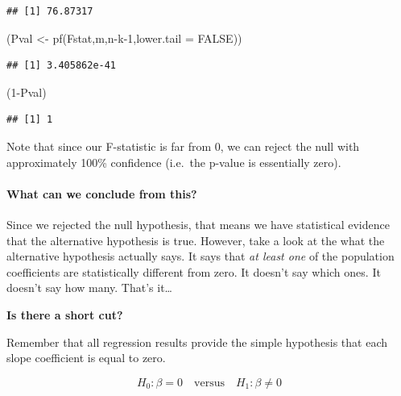 \documentclass[
]{book}
\newenvironment{Shaded}{\begin{snugshade}}{\end{snugshade}}
\newcommand{\AttributeTok}[1]{\textcolor[rgb]{0.77,0.63,0.00}{#1}}
\newcommand{\ConstantTok}[1]{\textcolor[rgb]{0.00,0.00,0.00}{#1}}
\newcommand{\DecValTok}[1]{\textcolor[rgb]{0.00,0.00,0.81}{#1}}
\newcommand{\FunctionTok}[1]{\textcolor[rgb]{0.00,0.00,0.00}{#1}}
\newcommand{\NormalTok}[1]{#1}
\newcommand{\OtherTok}[1]{\textcolor[rgb]{0.56,0.35,0.01}{#1}}
\newcommand{\SpecialCharTok}[1]{\textcolor[rgb]{0.00,0.00,0.00}{#1}}
\begin{document}
\begin{verbatim}
## [1] 76.87317
\end{verbatim}

\begin{Shaded}
\begin{Highlighting}[]
\NormalTok{(Pval }\OtherTok{\textless{}{-}} \FunctionTok{pf}\NormalTok{(Fstat,m,n}\SpecialCharTok{{-}}\NormalTok{k}\DecValTok{{-}1}\NormalTok{,}\AttributeTok{lower.tail =} \ConstantTok{FALSE}\NormalTok{))}
\end{Highlighting}
\end{Shaded}

\begin{verbatim}
## [1] 3.405862e-41
\end{verbatim}

\begin{Shaded}
\begin{Highlighting}[]
\NormalTok{(}\DecValTok{1}\SpecialCharTok{{-}}\NormalTok{Pval)}
\end{Highlighting}
\end{Shaded}

\begin{verbatim}
## [1] 1
\end{verbatim}

Note that since our F-statistic is far from 0, we can reject the null with approximately 100\% confidence (i.e.~the p-value is essentially zero).

\hypertarget{what-can-we-conclude-from-this}{%
\paragraph*{What can we conclude from this?}\label{what-can-we-conclude-from-this}}

Since we rejected the null hypothesis, that means we have statistical evidence that the alternative hypothesis is true. However, take a look at the what the alternative hypothesis actually says. It says that \emph{at least one} of the population coefficients are statistically different from zero. It doesn't say which ones. It doesn't say how many. That's it\ldots{}

\textbf{Is there a short cut?}

Remember that all regression results provide the simple hypothesis that each slope coefficient is equal to zero.

\[H_0: \beta=0 \quad \text{versus} \quad H_1: \beta \neq 0\]
\end{document}

